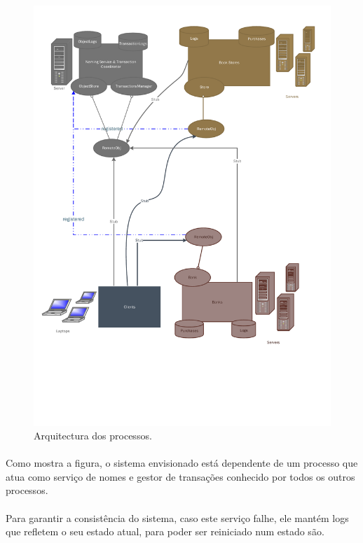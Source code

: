 \documentclass[11pt,a4paper]{report}
\begin{document}
\begin{figure}[H]
  \centering
  \includegraphics[scale=0.80,page=1]{Process_Architecture.pdf}
  \caption{Arquitectura dos processos.}
  \label{fig:procarq}
\end{figure}
\newpage

\paragraph{}Como mostra a figura, o sistema envisionado está dependente de um processo que atua como serviço de nomes e gestor de transações conhecido por todos os outros processos.

\paragraph{}Para garantir a consistência do sistema, caso este serviço falhe, ele mantém logs que refletem o seu estado atual, para poder ser reiniciado num estado são.
\end{document}
